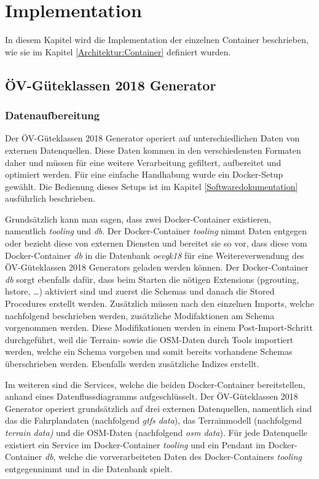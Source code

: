 
\section{Implementation}
\label{Implementation}

In diesem Kapitel wird die Implementation der einzelnen Container beschrieben, wie sie im Kapitel \ref{Architektur:Container} definiert wurden.

\subsection{ÖV-Güteklassen 2018 Generator}
\label{Implementation:ÖV-Güteklassen 2018 Generator}

\subsubsection{Datenaufbereitung}
\label{ÖV-Güteklassen 2018 Generator:Datenaufbereitung}

Der \gls{ÖV-Güteklassen} 2018 Generator operiert auf unterschiedlichen Daten von externen Datenquellen.
Diese Daten kommen in den verschiedensten Formaten daher und müssen für eine weitere Verarbeitung gefiltert, aufbereitet und optimiert werden.
Für eine einfache Handhabung wurde ein Docker-Setup gewählt.
Die Bedienung dieses Setups ist im Kapitel \ref{Softwaredokumentation} ausführlich beschrieben.

Grundsätzlich kann man sagen, dass zwei Docker-Container existieren, namentlich \emph{tooling} und \emph{db}.
Der Docker-Container \emph{tooling} nimmt Daten entgegen oder bezieht diese von externen Diensten und bereitet sie so vor, dass diese vom Docker-Container \emph{db} in die Datenbank \emph{oevgk18} für eine Weitereverwendung des \gls{ÖV-Güteklassen} 2018 Generators geladen werden können.
Der Docker-Container \emph{db} sorgt ebenfalls dafür, dass beim Starten die nötigen Extensions (pgrouting, hstore, \dots) aktiviert sind und zuerst die Schemas und danach die \glspl{Stored Procedure} erstellt werden.
Zusätzlich müssen nach den einzelnen Imports, welche nachfolgend beschrieben werden, zusätzliche Modifaktionen am Schema vorgenommen werden.
Diese Modifikationen werden in einem Post-Import-Schritt durchgeführt, weil die Terrain- sowie die OSM-Daten durch Tools importiert werden, welche ein Schema vorgeben und somit bereits vorhandene Schemas überschrieben werden.
Ebenfalls werden zusätzliche Indizes erstellt.

Im weiteren sind die Services, welche die beiden Docker-Container bereitstellen, anhand eines Datenflussdiagramms aufgeschlüsselt.
Der \gls{ÖV-Güteklassen} 2018 Generator operiert grundsätzlich auf drei externen Datenquellen, namentlich sind das die Fahrplandaten (nachfolgend \emph{gtfs data}), das \gls{Terrainmodell} (nachfolgend \emph{terrain data)} und die \acs{OSM}-Daten (nachfolgend \emph{osm data}).
Für jede Datenquelle existiert ein Service im Docker-Container \emph{tooling} und ein Pendant im Docker-Container \emph{db}, welche die vorverarbeiteten Daten des Docker-Containers \emph{tooling} entgegennimmt und in die Datenbank spielt.

